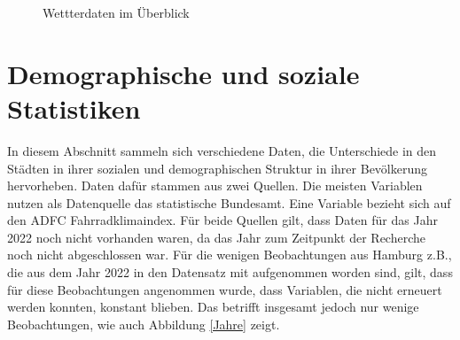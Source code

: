 \documentclass[a4paper,12pt]{thesis}
\begin{document}
\begin{figure}%
	\centering
	\qquad
	\caption{Wettterdaten im Überblick}%
	\label{fig:TempNied}%
\end{figure}


\section{Demographische und soziale Statistiken}

In diesem Abschnitt sammeln sich verschiedene Daten, die Unterschiede in den Städten in ihrer sozialen und demographischen Struktur in ihrer Bevölkerung hervorheben. Daten dafür stammen aus zwei Quellen. Die meisten Variablen nutzen als Datenquelle das statistische Bundesamt. Eine Variable bezieht sich auf den ADFC Fahrradklimaindex. Für beide Quellen gilt, dass Daten für das Jahr 2022 noch nicht vorhanden waren, da das Jahr zum Zeitpunkt der Recherche noch nicht abgeschlossen war. Für die wenigen Beobachtungen aus Hamburg z.B., die aus dem Jahr 2022 in den Datensatz mit aufgenommen worden sind, gilt, dass für diese Beobachtungen angenommen wurde, dass Variablen, die nicht erneuert werden konnten, konstant blieben. Das betrifft insgesamt jedoch nur wenige Beobachtungen, wie auch Abbildung \ref{Jahre} zeigt.
\end{document}

